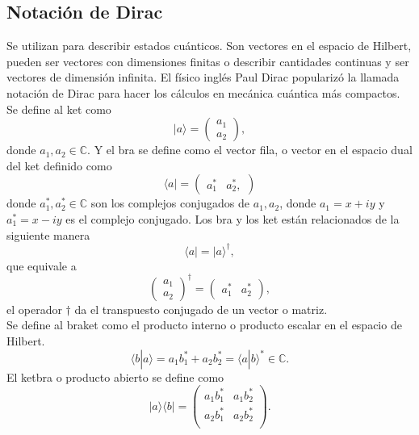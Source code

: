\documentclass[a4paper]{article}
\begin{document}
\subsection{Notación de Dirac}
Se utilizan para describir estados cuánticos. Son vectores en el espacio de Hilbert, pueden ser vectores con dimensiones finitas o describir cantidades continuas y ser vectores de dimensión infinita. El físico inglés Paul Dirac popularizó la llamada notación de Dirac para hacer los cálculos en mecánica cuántica más compactos.
Se define al ket como
\begin{equation}
|a\rangle=
	\begin{pmatrix}
		a_1\\
		a_2
	\end{pmatrix},
\end{equation}
donde $a_1, a_2 \in \mathbb{C} $. Y el bra se define como el vector fila, o vector en el espacio dual del ket definido como 
\begin{equation}
\langle a|=
	\begin{pmatrix}
		a_1^*&a_2^* ,
	\end{pmatrix}
\end{equation}
donde $a_1^*, a_2^* \in \mathbb{C} $ son los complejos conjugados de $a_1, a_2$, donde $a_1=x+iy$ y $a_1^*=x-iy$ es el complejo conjugado.
Los bra y los ket están relacionados de la siguiente manera
\begin{equation}
\langle a|=|a\rangle^\dagger ,
\end{equation}
que equivale a 
\begin{equation}
\begin{pmatrix}
		a_1\\
		a_2
	\end{pmatrix}^\dagger=
	\begin{pmatrix}
		a_1^*&a_2^*
	\end{pmatrix},
\end{equation}
el operador $\dagger$ da el transpuesto conjugado de un vector o matriz.\\
Se define al braket como el producto interno o producto escalar en el espacio de Hilbert.
\begin{equation}
\langle b | a\rangle=a_1b_1^*+a_2b_2^*=\langle a | b\rangle^*\in \mathbb{C} .
\end{equation}
El ketbra o producto abierto se define como 
\begin{equation}
|a\rangle\langle b|=
	\begin{pmatrix}
		a_1 b_1^*& a_1 b_2^*\\
		a_2 b_1^*& a_2 b_2^*\\
	\end{pmatrix}.
\end{equation}
\end{document}
